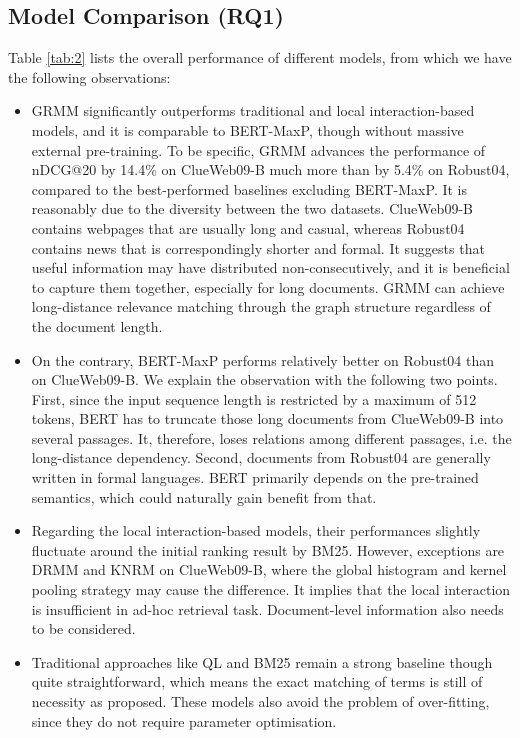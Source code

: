 \subsection{Model Comparison (RQ1)}
Table \ref{tab:2} lists the overall performance of different models, from which we have the following observations:
\begin{itemize}
	\item GRMM significantly outperforms traditional and local interaction-based models, and it is comparable to BERT-MaxP, though without massive external pre-training. To be specific, GRMM advances the performance of nDCG@20 by 14.4\% on ClueWeb09-B much more than by 5.4\% on Robust04, compared to the best-performed baselines excluding BERT-MaxP. It is reasonably due to the diversity between the two datasets. ClueWeb09-B contains webpages that are usually long and casual, whereas Robust04 contains news that is correspondingly shorter and formal. It suggests that useful information may have distributed non-consecutively, and it is beneficial to capture them together, especially for long documents. GRMM can achieve long-distance relevance matching through the graph structure regardless of the document length. 
	
	\item On the contrary, BERT-MaxP performs relatively better on Robust04 than on ClueWeb09-B. We explain the observation with the following two points. First, since the input sequence length is restricted by a maximum of 512 tokens, BERT has to truncate those long documents from ClueWeb09-B into several passages. It, therefore, loses relations among different passages, i.e. the long-distance dependency. Second, documents from Robust04 are generally written in formal languages. BERT primarily depends on the pre-trained semantics, which could naturally gain benefit from that. 
	
	\item Regarding the local interaction-based models, their performances slightly fluctuate around the initial ranking result by BM25. However, exceptions are DRMM and KNRM on ClueWeb09-B, where the global histogram and kernel pooling strategy may cause the difference. It implies that the local interaction is insufficient in ad-hoc retrieval task. Document-level information also needs to be considered. 
	
	\item Traditional approaches like QL and BM25 remain a strong baseline though quite straightforward, which means the exact matching of terms is still of necessity as \citet{guo2016deep} proposed. These models also avoid the problem of over-fitting, since they do not require parameter optimisation. 
\end{itemize}                       

